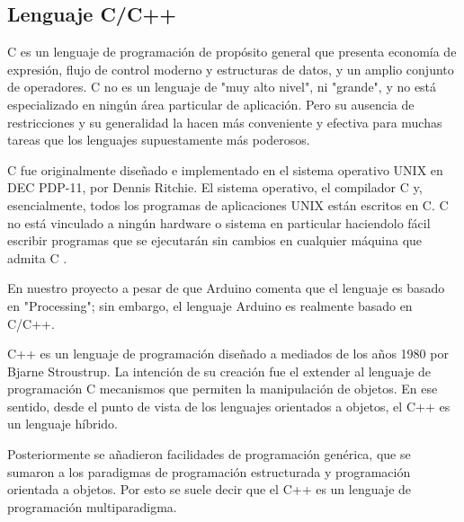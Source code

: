\subsection{Lenguaje C/C++}
	\par
		C es un lenguaje de programación de propósito general que presenta economía de expresión, flujo de control moderno y estructuras de datos, y un amplio conjunto de operadores.
		C no es un lenguaje de "muy alto nivel", ni "grande", y no está especializado en ningún área particular de aplicación. Pero su ausencia de restricciones y su generalidad la hacen más conveniente y efectiva para muchas tareas que los lenguajes supuestamente más poderosos.
		
	\par \noindent
		C fue originalmente diseñado e implementado en el sistema operativo UNIX en DEC PDP-11, por Dennis Ritchie. El sistema operativo, el compilador C y, esencialmente, todos los programas de aplicaciones UNIX están escritos en C. C no está vinculado a ningún hardware o sistema en particular haciendolo fácil escribir programas que se ejecutarán sin cambios en cualquier máquina que admita C .
		
	\par \noindent
		En nuestro proyecto a pesar de que Arduino comenta que el lenguaje es basado en "Processing"; sin embargo, el lenguaje Arduino es realmente basado en C/C++.
		
	\par \noindent
		C++ es un lenguaje de programación diseñado a mediados de los años 1980 por Bjarne Stroustrup. La intención de su creación fue el extender al lenguaje de programación C mecanismos que permiten la manipulación de objetos. En ese sentido, desde el punto de vista de los lenguajes orientados a objetos, el C++ es un lenguaje híbrido.
		
		Posteriormente se añadieron facilidades de programación genérica, que se sumaron a los paradigmas de programación estructurada y programación orientada a objetos. Por esto se suele decir que el C++ es un lenguaje de programación multiparadigma. 